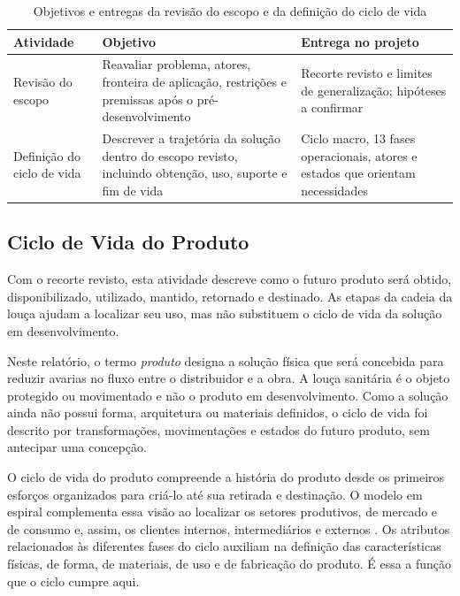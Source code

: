 \begin{table}[H]
\caption{Objetivos e entregas da revisão do escopo e da definição do ciclo de vida}
\label{tab:escopo-ciclo}
\centering\footnotesize
\begin{tabularx}{\textwidth}{L{2.7cm}YY}
\toprule\textbf{Atividade}&\textbf{Objetivo}&\textbf{Entrega no projeto}\\\midrule
Revisão do escopo&Reavaliar problema, atores, fronteira de aplicação, restrições e premissas após o pré-desenvolvimento&Recorte revisto e limites de generalização; hipóteses a confirmar\\
Definição do ciclo de vida&Descrever a trajetória da solução dentro do escopo revisto, incluindo obtenção, uso, suporte e fim de vida&Ciclo macro, 13 fases operacionais, atores e estados que orientam necessidades\\
\bottomrule\end{tabularx}
\end{table}

\subsection{Ciclo de Vida do Produto}
\label{sec:ciclo-vida}

Com o recorte revisto, esta atividade descreve como o futuro produto será obtido, disponibilizado, utilizado, mantido, retornado e destinado. As etapas da cadeia da louça ajudam a localizar seu uso, mas não substituem o ciclo de vida da solução em desenvolvimento.

Neste relatório, o termo \textit{produto} designa a solução física que será concebida para reduzir avarias no fluxo entre o distribuidor e a obra. A louça sanitária é o objeto protegido ou movimentado e não o produto em desenvolvimento. Como a solução ainda não possui forma, arquitetura ou materiais definidos, o ciclo de vida foi descrito por transformações, movimentações e estados do futuro produto, sem antecipar uma concepção.

O ciclo de vida do produto compreende a história do produto desde os primeiros esforços organizados para criá-lo até sua retirada e destinação. O modelo em espiral complementa essa visão ao localizar os setores produtivos, de mercado e de consumo e, assim, os clientes internos, intermediários e externos \citep{rozenfeld2006,back2008,fonseca2000}. Os atributos relacionados às diferentes fases do ciclo auxiliam na definição das características físicas, de forma, de materiais, de uso e de fabricação do produto. É essa a função que o ciclo cumpre aqui.

